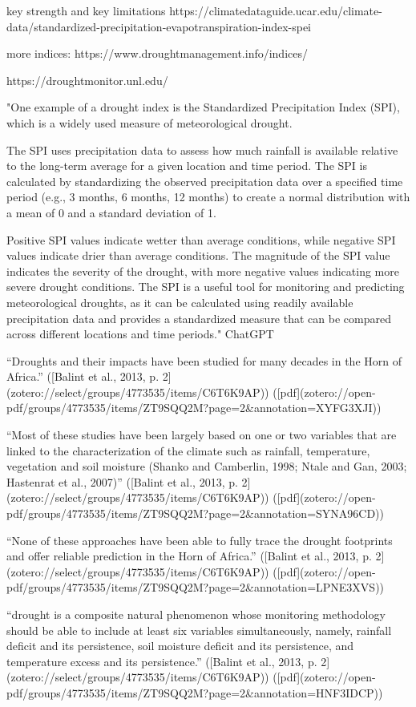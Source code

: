 {key strength and key limitations https://climatedataguide.ucar.edu/climate-data/standardized-precipitation-evapotranspiration-index-spei


more indices: https://www.droughtmanagement.info/indices/

https://droughtmonitor.unl.edu/


"One example of a drought index is the Standardized Precipitation Index (SPI), which is a widely used measure of meteorological drought.

The SPI uses precipitation data to assess how much rainfall is available relative to the long-term average for a given location and time period. The SPI is calculated by standardizing the observed precipitation data over a specified time period (e.g., 3 months, 6 months, 12 months) to create a normal distribution with a mean of 0 and a standard deviation of 1.

Positive SPI values indicate wetter than average conditions, while negative SPI values indicate drier than average conditions. The magnitude of the SPI value indicates the severity of the drought, with more negative values indicating more severe drought conditions. The SPI is a useful tool for monitoring and predicting meteorological droughts, as it can be calculated using readily available precipitation data and provides a standardized measure that can be compared across different locations and time periods." ChatGPT


“Droughts and their impacts have been studied for many decades in the Horn of Africa.” ([Balint et al., 2013, p. 2](zotero://select/groups/4773535/items/C6T6K9AP)) ([pdf](zotero://open-pdf/groups/4773535/items/ZT9SQQ2M?page=2&annotation=XYFG3XJI))

“Most of these studies have been largely based on one or two variables that are linked to the characterization of the climate such as rainfall, temperature, vegetation and soil moisture (Shanko and Camberlin, 1998; Ntale and Gan, 2003; Hastenrat et al., 2007)” ([Balint et al., 2013, p. 2](zotero://select/groups/4773535/items/C6T6K9AP)) ([pdf](zotero://open-pdf/groups/4773535/items/ZT9SQQ2M?page=2&annotation=SYNA96CD))

“None of these approaches have been able to fully trace the drought footprints and offer reliable prediction in the Horn of Africa.” ([Balint et al., 2013, p. 2](zotero://select/groups/4773535/items/C6T6K9AP)) ([pdf](zotero://open-pdf/groups/4773535/items/ZT9SQQ2M?page=2&annotation=LPNE3XVS))

“drought is a composite natural phenomenon whose monitoring methodology should be able to include at least six variables simultaneously, namely, rainfall deficit and its persistence, soil moisture deficit and its persistence, and temperature excess and its persistence.” ([Balint et al., 2013, p. 2](zotero://select/groups/4773535/items/C6T6K9AP)) ([pdf](zotero://open-pdf/groups/4773535/items/ZT9SQQ2M?page=2&annotation=HNF3IDCP))

}
